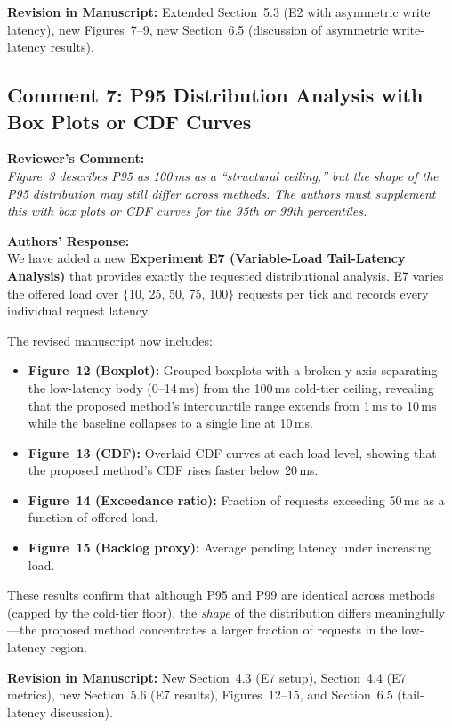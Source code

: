 \documentclass[11pt,a4paper]{article}
\newcommand{\reviewercomment}[1]{%
  \vspace{6pt}\noindent\textbf{\textcolor{reviewercolor}{Reviewer's Comment:}}\\
  \textcolor{reviewercolor}{\itshape #1}\vspace{4pt}}
\newcommand{\response}[1]{%
  \noindent\textbf{\textcolor{responsecolor}{Authors' Response:}}\\
  #1\vspace{8pt}}
\newcommand{\revision}[1]{%
  \noindent\textbf{Revision in Manuscript:} #1\vspace{4pt}}
\begin{document}
\revision{Extended Section~5.3 (E2 with asymmetric write latency), new Figures~7--9, new Section~6.5 (discussion of asymmetric write-latency results).}

\subsection*{Comment 7: P95 Distribution Analysis with Box Plots or CDF Curves}

\reviewercomment{Figure~3 describes P95 as 100\,ms as a ``structural ceiling,'' but the shape of the P95 distribution may still differ across methods. The authors must supplement this with box plots or CDF curves for the 95th or 99th percentiles.}

\response{We have added a new \textbf{Experiment E7 (Variable-Load Tail-Latency Analysis)} that provides exactly the requested distributional analysis. E7 varies the offered load over $\{$10, 25, 50, 75, 100$\}$ requests per tick and records every individual request latency.

The revised manuscript now includes:
\begin{itemize}[nosep]
\item \textbf{Figure~12 (Boxplot):} Grouped boxplots with a broken y-axis separating the low-latency body (0--14\,ms) from the 100\,ms cold-tier ceiling, revealing that the proposed method's interquartile range extends from 1\,ms to 10\,ms while the baseline collapses to a single line at 10\,ms.
\item \textbf{Figure~13 (CDF):} Overlaid CDF curves at each load level, showing that the proposed method's CDF rises faster below 20\,ms.
\item \textbf{Figure~14 (Exceedance ratio):} Fraction of requests exceeding 50\,ms as a function of offered load.
\item \textbf{Figure~15 (Backlog proxy):} Average pending latency under increasing load.
\end{itemize}

These results confirm that although P95 and P99 are identical across methods (capped by the cold-tier floor), the \emph{shape} of the distribution differs meaningfully---the proposed method concentrates a larger fraction of requests in the low-latency region.}

\revision{New Section~4.3 (E7 setup), Section~4.4 (E7 metrics), new Section~5.6 (E7 results), Figures~12--15, and Section~6.5 (tail-latency discussion).}
\end{document}
